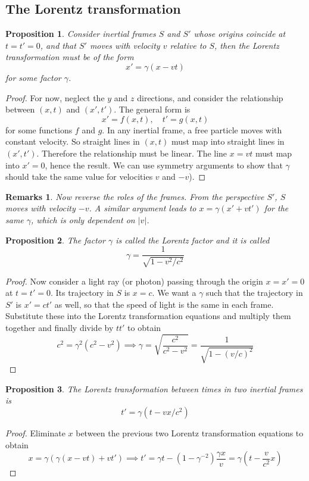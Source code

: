\documentclass[a4paper]{article}
\newtheorem{remarks}{Remarks}[section]
\newtheorem{prop}{Proposition}[section]
\theoremstyle{new}
\begin{document}
\subsection{The Lorentz transformation}
\begin{prop}
  Consider inertial frames $S$ and $S'$ whose origins coincide at $t = t' = 0$, and that $S'$ moves with velocity $v$ relative to $S$, then the Lorentz transformation must be of the form
  $$x'=\gamma(x-vt)$$
  for some factor $\gamma$.
\end{prop}
\begin{proof}
 For now, neglect the $y$ and $z$ directions, and consider the relationship between $(x, t)$ and $(x', t')$. The general form is
$$x' = f(x, t),\quad t' = g(x, t)$$
for some functions $f$ and $g$. In any inertial frame, a free particle moves with constant velocity. So straight lines in $(x, t)$ must map into straight lines in $(x', t')$. Therefore the relationship must be linear. The line $x = vt$ must map into $x'= 0$, hence the result. We can use symmetry arguments to show that $\gamma$ should take the same value for velocities $v$ and $-v$).
\end{proof}
\begin{remarks}
Now reverse the roles of the frames. From the perspective $S'$, $S$ moves with velocity $-v$. A similar argument leads to $x=\gamma(x'+vt')$ for the same $\gamma$, which is only dependent on $|v|$.
\end{remarks}
\begin{prop}
  The factor $\gamma$ is called the Lorentz factor and it is called
  $$\gamma=\frac{1}{\sqrt{1-v^2/c^2}}$$
\end{prop}
\begin{proof}
Now consider a light ray (or photon) passing through the origin $x = x' = 0$ at $t = t' = 0$. Its trajectory in $S$ is
$x = c$. We want a $\gamma$ such that the trajectory in $S'$ is $x' = ct'$ as well, so that the speed of light is the same in each frame. Substitute these into the Lorentz transformation equations and multiply them together and finally divide by $tt'$ to obtain
$$  c^2 = \gamma^2(c^2 - v^2)\implies \gamma = \sqrt{\frac{c^2}{c^2 - v^2}} = \frac{1}{\sqrt{1 - (v/c)^2}}$$
\end{proof}
\begin{prop}
  The Lorentz transformation between times in two inertial frames is
  $$t'=\gamma(t-vx/c^2)$$
\end{prop}
\begin{proof}
Eliminate $x$ between the previous two Lorentz transformation equations to obtain
$$x = \gamma(\gamma(x - vt) + vt')\implies
t' = \gamma t - (1 - \gamma^{-2})\frac{\gamma x}{v} = \gamma\left(t - \frac{v}{c^2}x\right)$$
\end{proof}
\end{document}

